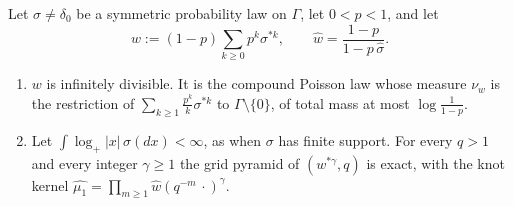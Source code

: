 \begin{proposition}
\label{prop:resolvent-masks-exact}
\leanok
Let $\sigma \ne \delta_0$ be a symmetric probability law on $\Gamma$, let $0 < p < 1$, and let
\begin{equation}\label{eq:resolvent-mask}
w := (1 - p)\sum_{k \ge 0}p^k\sigma^{*k}, \qquad \widehat{w} = \frac{1 - p}{1 - p\,\widehat{\sigma}} .
\end{equation}
\begin{enumerate}
\item $w$ is infinitely divisible. It is the compound Poisson law whose \Levy{} measure $\nu_w$ is
the restriction of $\sum_{k \ge 1}\tfrac{p^k}{k}\sigma^{*k}$ to $\Gamma \setminus \{0\}$, of total
mass at most $\log\frac{1}{1-p}$.
\item Let $\int\log_+|x|\,\sigma(dx) < \infty$, as when $\sigma$ has finite support. For every
$q > 1$ and every integer $\gamma \ge 1$ the grid pyramid of $(w^{*\gamma}, q)$ is exact, with the
knot kernel
$\widehat{\mu_1} = \prod_{m \ge 1}\widehat{w}(q^{-m}\,\cdot)^\gamma$.

\end{enumerate}
\end{proposition}
